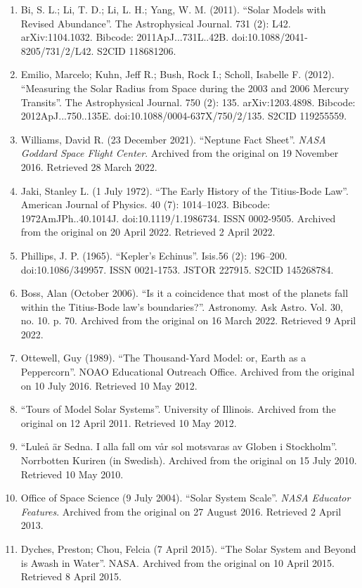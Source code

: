 \begin{enumerate}
\item Bi, S. L.; Li, T. D.; Li, L. H.; Yang, W. M. (2011). ``Solar Models with Revised Abundance''. The Astrophysical Journal. 731 (2): L42. arXiv:1104.1032. Bibcode: 2011ApJ...731L..42B. doi:10.1088/2041-8205/731/2/L42. S2CID 118681206.
\item Emilio, Marcelo; Kuhn, Jeff R.; Bush, Rock I.; Scholl, Isabelle F. (2012). ``Measuring the Solar Radius from Space during the 2003 and 2006 Mercury Transits''. The Astrophysical Journal. 750 (2): 135. arXiv:1203.4898. Bibcode: 2012ApJ...750..135E. doi:10.1088/0004-637X/750/2/135. S2CID 119255559.
\item Williams, David R. (23 December 2021). ``Neptune Fact Sheet''. \textit{NASA Goddard Space Flight Center}. Archived from the original on 19 November 2016. Retrieved 28 March 2022.
\item Jaki, Stanley L. (1 July 1972). ``The Early History of the Titius-Bode Law''. American Journal of Physics. 40 (7): 1014–1023. Bibcode: 1972AmJPh..40.1014J. doi:10.1119/1.1986734. ISSN 0002-9505. Archived from the original on 20 April 2022. Retrieved 2 April 2022.
\item Phillips, J. P. (1965). ``Kepler's Echinus''. Isis.56 (2): 196–200. doi:10.1086/349957. ISSN 0021-1753. JSTOR 227915. S2CID 145268784.
\item Boss, Alan (October 2006). ``Is it a coincidence that most of the planets fall within the Titius-Bode law's boundaries?''. Astronomy. Ask Astro. Vol. 30, no. 10. p. 70. Archived from the original on 16 March 2022. Retrieved 9 April 2022.
\item Ottewell, Guy (1989). ``The Thousand-Yard Model: or, Earth as a Peppercorn''. NOAO Educational Outreach Office. Archived from the original on 10 July 2016. Retrieved 10 May 2012.
\item ``Tours of Model Solar Systems''. University of Illinois. Archived from the original on 12 April 2011. Retrieved 10 May 2012.
\item ``Luleå är Sedna. I alla fall om vår sol motsvaras av Globen i Stockholm''. Norrbotten Kuriren (in Swedish). Archived from the original on 15 July 2010. Retrieved 10 May 2010.
\item Office of Space Science (9 July 2004). ``Solar System Scale''. \textit{NASA Educator Features}. Archived from the original on 27 August 2016. Retrieved 2 April 2013.
\item Dyches, Preston; Chou, Felcia (7 April 2015). ``The Solar System and Beyond is Awash in Water''. NASA. Archived from the original on 10 April 2015. Retrieved 8 April 2015.

\end{enumerate}
